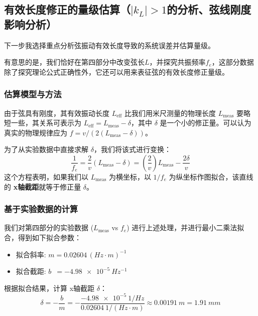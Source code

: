 \documentclass[10pt,twocolumn]{article}
\begin{document}
\subsection{有效长度修正的量级估算（$|k_L|>1$的分析、弦线刚度影响分析）}
\par
下一步我选择重点分析弦振动有效长度导致的系统误差并估算量级。
\par
有意思的是，我们恰好在第四部分中改变弦长$L$，并探究共振频率$f_e$，这部分数据除了探究理论公式正确性外，它还可以用来表征弦的有效长度修正量级。

\subsubsection{估算模型与方法}
由于弦具有刚度，其有效振动长度 $L_{\text{eff}}$ 比我们用米尺测量的物理长度 $L_{\text{meas}}$ 要略短一些，其关系可表示为 $L_{\text{eff}} = L_{\text{meas}} - \delta$，其中 $\delta$ 是一个小的修正量。可以认为真实的物理规律应为 $f = v/(2(L_{\text{meas}} - \delta))$。

为了从实验数据中直接求解 $\delta$，我们将该式进行变换：
\begin{equation}
    \frac{1}{f_e} = \frac{2}{v} (L_{\text{meas}} - \delta) = \left(\frac{2}{v}\right)L_{\text{meas}} - \frac{2\delta}{v}
    \label{eq:linear_L}
\end{equation}
这个方程表明，如果我们以 $L_{\text{meas}}$ 为横坐标，以 $1/f_e$ 为纵坐标作图拟合，该直线的 \textbf{x轴截距}就等于修正量 $\delta$。

\subsubsection{基于实验数据的计算}
我们对第四部分的实验数据 ($L_{\text{meas}}$ vs $f_e$) 进行上述处理，并进行最小二乘法拟合，得到如下拟合参数：
\begin{itemize}
    \item 拟合斜率: $m = 0.02604\,(Hz \cdot m)^{-1}$
    \item 拟合截距: $b\,\,\, = \SI{-4.98e-5}{Hz^{-1}}$
\end{itemize}
根据拟合结果，计算 x轴截距 $\delta$：
\begin{equation}
    \delta = - \frac{b}{m} = - \frac{\SI{-4.98e-5}{1/Hz}}{\SI{0.02604}{1/(Hz \cdot m)}} \approx \SI{0.00191}{m} = \SI{1.91}{mm}
\end{equation}
\end{document}

